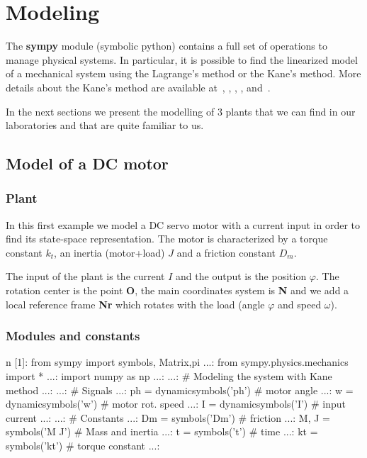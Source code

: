 \chapter{Modeling}
The \textbf{sympy} module (symbolic python) contains a full set of operations 
to manage physical systems.
In particular,  it is possible to find the linearized model of a 
mechanical system using the Lagrange's method or the Kane's method.
More details about the Kane's method are available at~\cite{KANE1}, 
\cite{KANE2}, \cite{KANE6}, \cite{KANE3}, \cite{KANE4} and~\cite{KANE5}.

In the next sections we present the modelling of 3 plants that we can find in 
our laboratories and that are quite familiar to us.

\section{Model of a DC motor}
\subsection{Plant}
In this first example we model a DC servo motor with a current input in order 
to find its state-space representation. The motor is characterized by a torque 
constant $k_t$, an inertia (motor+load) $J$ and a friction constant $D_m$.

The input of the plant is the current $I$ and the output is the position 
$\varphi$. The rotation center is the point \textbf{O}, the main coordinates 
system is \textbf{N} and we add a local reference frame \textbf{Nr} which 
rotates with the load (angle $\varphi$ and speed $\omega$).

\subsection{Modules and constants}
\begin{code}
n [1]: from sympy import symbols, Matrix,pi
   ...: from sympy.physics.mechanics import *
   ...: import numpy as np
   ...: 
   ...: # Modeling the system with Kane method
   ...: 
   ...: # Signals
   ...: ph = dynamicsymbols('ph')    # motor angle
   ...: w  = dynamicsymbols('w')     # motor rot. speed
   ...: I  = dynamicsymbols('I')     # input current
   ...: 
   ...: # Constants
   ...: Dm = symbols('Dm')           # friction
   ...: M, J = symbols('M J')        # Mass and inertia
   ...: t = symbols('t')             # time
   ...: kt  = symbols('kt')          # torque constant
   ...: 
\end{code}

